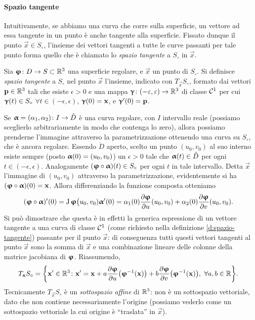 \paragraph{Spazio tangente}
Intuitivamente, se abbiamo una curva che corre sulla superficie, un vettore ad essa tangente in un punto è anche tangente alla superficie.
Fissato dunque il punto $\vec x\in S_\circ$, l'insieme dei vettori tangenti a tutte le curve passanti per tale punto forma quello che è chiamato lo \emph{spazio tangente} a $S_\circ$ in $\vec x$.
\begin{definizione} \label{d:spazio-tangente}
	Sia $\bm{\upvarphi}\colon D\to S\subset\mathbb{R}^3$ una superficie regolare, e $\vec x$ un punto di $S_\circ$.
	Si definisce \emph{spazio tangente} a $S_\circ$ nel punto $\vec x$ l'insieme, indicato con $T_{\vec x}S_\circ$, formato dai vettori $\mathbf{p}\in\mathbb{R}^3$ tali che esiste $\epsilon>0$ e una mappa $\bm{\upgamma}\colon(-\varepsilon,\varepsilon)\to\mathbb{R}^3$ di classe $\mathcal{C}^{{1}}$ per cui $\bm{\upgamma}(t)\in S_\circ$ $\forall t\in(-\epsilon,\epsilon)$, $\bm{\upgamma}(0)=\mathbf{x}$, e $\bm{\upgamma}'(0)=\mathbf{p}$.
\end{definizione}
Se $\bm{\upalpha}=(\alpha_1,\alpha_2)\colon I\to\mathring{D}$ è una curva regolare, con $I$ intervallo reale (possiamo sceglierlo arbitrariamente in modo che contenga lo zero), allora possiamo prenderne l'immagine attraverso la parametrizzazione ottenendo una curva su $S_\circ$, che è ancora regolare.
Essendo $\mathring{D}$ aperto, scelto un punto $(u_0,v_0)$ al suo interno esiste sempre (posto $\bm{\upalpha}(0)=(u_0,v_0)$) un $\epsilon>0$ tale che $\bm{\upalpha}(t)\in\mathring{D}$ per ogni $t\in(-\epsilon,\epsilon)$.
Analogamente $(\bm{\upvarphi}\circ\bm{\upalpha})(t)\in S_\circ$ per ogni $t$ in tale intervallo.
Detta $\vec x$ l'immagine di $(u_0,v_0)$ attraverso la parametrizzazione, evidentemente si ha $(\bm{\upvarphi}\circ\bm{\upalpha})(0)=\mathbf{x}$.
Allora differenziando la funzione composta otteniamo
\begin{equation}
	(\bm{\upvarphi}\circ\bm{\upalpha})'(0)=\operatorname{J}\bm{\upvarphi}\big(u_0,v_0)\bm{\upalpha}'(0)=\alpha_1(0)\frac{\partial {\bm{\upvarphi}}}{\partial {u}}(u_0,v_0)+\alpha_2(0)\frac{\partial {\bm{\upvarphi}}}{\partial {v}}(u_0,v_0).
\end{equation}
Si può dimostrare che questa è in effetti la generica espressione di un vettore tangente a una curva di classe $\mathcal{C}^{{1}}$ (come richiesto nella definizione \ref{d:spazio-tangente}) passante per il punto $\vec x$: di conseguenza tutti questi vettori tangenti al punto $\vec x$ sono la somma di $\vec x$ e una combinazione lineare delle colonne della matrice jacobiana di $\bm{\upvarphi}$.
Riassumendo,
\begin{equation}
	T_{\mathbf{x}}S_\circ=\bigg\{\mathbf{x}'\in\mathbb{R}^3\colon \mathbf{x}'=\mathbf{x}+a\frac{\partial {\bm{\upvarphi}}}{\partial {u}}\big(\bm{\upvarphi}^{-1}(\mathbf{x})\big)+b\frac{\partial {\bm{\upvarphi}}}{\partial {v}}\big(\bm{\upvarphi}^{-1}(\mathbf{x})\big),\ \forall a,b\in\mathbb{R}\bigg\}.
	\label{eq:spazio-tangente}
\end{equation}
Tecnicamente $T_{\vec x}S_\circ$ è un \emph{sottospazio affine} di $\mathbb{R}^3$: non è un sottospazio vettoriale, dato che non contiene necessariamente l'origine (possiamo vederlo come un sottospazio vettoriale la cui origine è ``traslata'' in $\vec x$).

